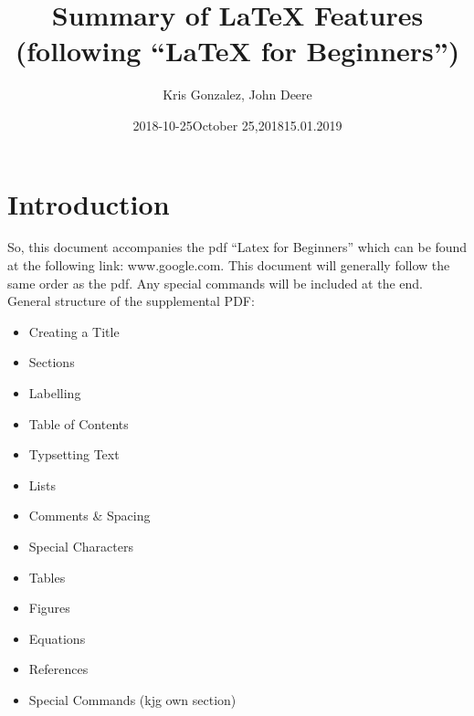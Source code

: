 \documentclass[a4paper,12pt]{article} %
\begin{document}
\title{Summary of LaTeX Features \\
(following ``LaTeX for Beginners'')}
\author{Kris Gonzalez, John Deere} 
\date{2018-10-25}
\date{October 25,2018}
\date{15.01.2019} %
\maketitle %


\newpage
\tableofcontents


\newpage
{} %
\section{Introduction}
\label{Introduction}
So, this document accompanies the pdf ``Latex for Beginners'' which can be found at the following link: www.google.com. This document will generally follow  the same order as the pdf. Any special commands will be included at the end. General structure of the supplemental PDF: 
\begin{itemize}
\itemsep=-0.5em
\item Creating a Title
\item Sections
\item Labelling
\item Table of Contents
\item Typsetting Text
\item Lists
\item Comments \& Spacing
\item Special Characters
\item Tables
\item Figures
\item Equations
\item References
\item Special Commands (kjg own section)
\end{itemize} %
\end{document}
